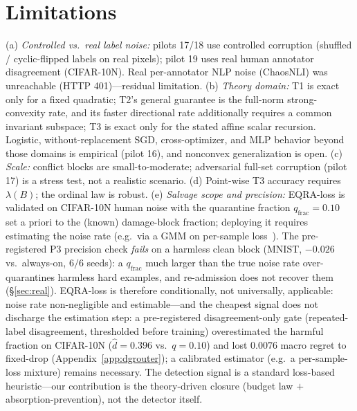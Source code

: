 \documentclass{article}
\newcommand{\B}{B}            %
\begin{document}
\section{Limitations}
\label{sec:limitations}
(a) \emph{Controlled vs.\ real label noise:} pilots 17/18 use controlled corruption (shuffled /
cyclic-flipped labels on real pixels); pilot 19 uses real human annotator disagreement
(CIFAR-10N). Real per-annotator NLP noise (ChaosNLI) was unreachable (HTTP 401)---residual
limitation. (b) \emph{Theory domain:} T1 is exact only for a fixed quadratic; T2's general
guarantee is the full-norm strong-convexity rate, and its faster directional rate additionally
requires a common invariant subspace; T3 is exact only for the stated affine scalar recursion.
Logistic, without-replacement SGD, cross-optimizer, and MLP behavior beyond those domains is
empirical (pilot 16), and nonconvex generalization is open. (c) \emph{Scale:} conflict
blocks are small-to-moderate; adversarial full-set corruption (pilot 17) is a stress test, not a
realistic scenario. (d) Point-wise T3 accuracy requires $\lambda(\B)$; the ordinal law is robust.
(e) \emph{Salvage scope and precision:} EQRA-loss is validated on CIFAR-10N human noise with the
quarantine fraction $q_{\text{frac}}{=}0.10$ set a priori to the (known) damage-block fraction;
deploying it requires estimating the noise rate (e.g.\ via a GMM on per-sample
loss~\citep{arazo2019unsupervised}). The pre-registered P3 precision check \emph{fails} on a
harmless clean block (MNIST, $-0.026$ vs.\ always-on, $6/6$ seeds): a $q_{\text{frac}}$ much
larger than the true noise rate over-quarantines harmless hard examples, and re-admission does
not recover them (\S\ref{sec:real}). EQRA-loss is therefore conditionally, not universally,
applicable: noise rate non-negligible and estimable---and the cheapest signal does not
discharge the estimation step: a pre-registered disagreement-only gate (repeated-label
disagreement, thresholded before training) overestimated the harmful fraction on CIFAR-10N
($\hat d{=}0.396$ vs.\ $q{=}0.10$) and lost $0.0076$ macro regret to fixed-drop
(Appendix~\ref{app:dgrouter}); a calibrated estimator (e.g.\ a per-sample-loss mixture)
remains necessary. The detection signal is a standard
loss-based heuristic---our contribution is the theory-driven closure (budget law $+$
absorption-prevention), not the detector itself.
\end{document}
